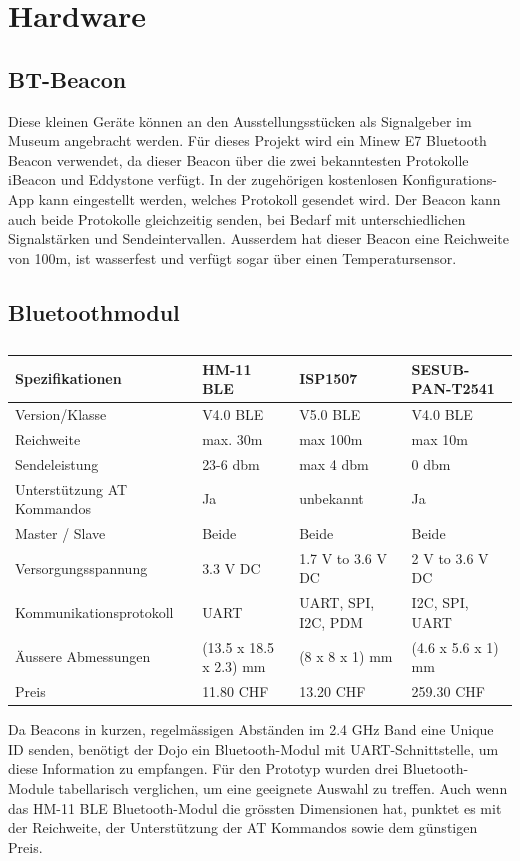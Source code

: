 \section{Hardware}
\subsection{BT-Beacon}
Diese kleinen Geräte können an den Ausstellungsstücken als Signalgeber im Museum angebracht werden. Für dieses Projekt wird ein Minew E7 Bluetooth Beacon verwendet, da dieser Beacon über die zwei bekanntesten Protokolle iBeacon und Eddystone verfügt. In der zugehörigen kostenlosen Konfigurations-App kann eingestellt werden, welches Protokoll gesendet wird. Der Beacon kann auch beide Protokolle gleichzeitig senden, bei Bedarf mit unterschiedlichen Signalstärken und Sendeintervallen. Ausserdem hat dieser Beacon eine Reichweite von 100m, ist wasserfest und verfügt sogar über einen Temperatursensor.
\newpage

\subsection{Bluetoothmodul}
\begin{table}[H]
\footnotesize
\begin{tabular}{|l|lll|}
\toprule
\textbf{Spezifikationen} & \textbf{HM-11 BLE} & \textbf{ISP1507 } & \textbf{SESUB-PAN-T2541} \\ 
\hline 
Version/Klasse & V4.0 BLE  & V5.0 BLE & V4.0 BLE \\ 
\hline 
Reichweite & max. 30m & max 100m & max 10m \\ 
\hline 
Sendeleistung & 23-6 dbm & max 4 dbm & 0 dbm \\ 
\hline 
Unterstützung AT Kommandos & Ja & unbekannt & Ja \\ 
\hline 
Master / Slave & Beide & Beide & Beide \\ 
\hline 
Versorgungsspannung & 3.3 V DC & 1.7 V to 3.6 V DC & 2 V to 3.6 V DC \\ 
\hline 
Kommunikationsprotokoll & UART  & UART, SPI, I2C, PDM & I2C, SPI, UART \\ 
\hline 
Äussere Abmessungen & (13.5 x 18.5 x 2.3) mm & (8 x 8 x 1) mm & (4.6 x 5.6 x 1) mm \\ 
\hline 
Preis & 11.80 CHF & 13.20 CHF & 259.30 CHF \\ 
\bottomrule
\end{tabular} 
\caption{}
\label{tab:bluetoothmodul}
\end{table}
Da Beacons in kurzen, regelmässigen Abständen im 2.4 GHz Band eine Unique ID senden, benötigt der Dojo ein Bluetooth-Modul mit UART-Schnittstelle, um diese Information zu empfangen. 
Für den Prototyp wurden drei Bluetooth-Module tabellarisch verglichen, um eine geeignete Auswahl zu treffen. Auch wenn das HM-11 BLE Bluetooth-Modul die grössten Dimensionen hat, punktet es mit der Reichweite, der Unterstützung der AT Kommandos sowie dem günstigen Preis. 

